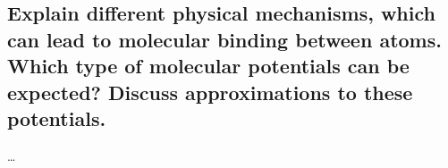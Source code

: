 \subsection{Explain different physical mechanisms, which can lead to molecular binding between atoms. Which type of molecular potentials can be expected? Discuss approximations to these potentials.}


\ldots